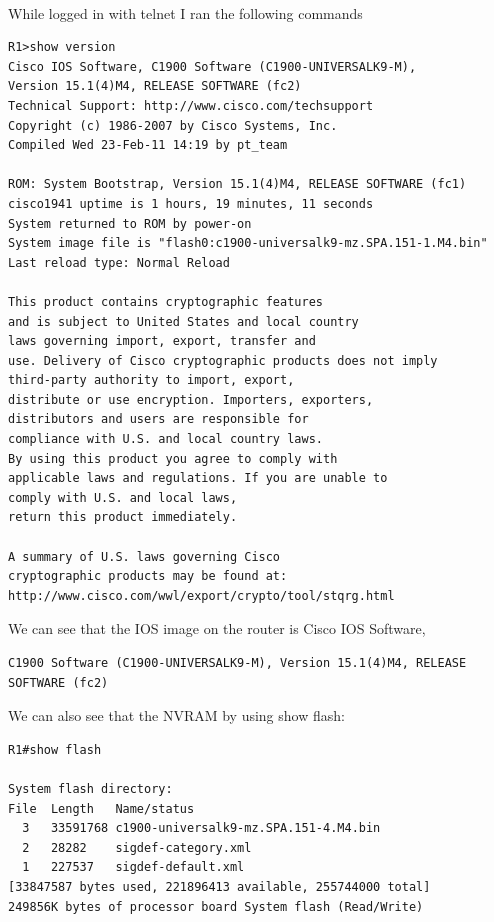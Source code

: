 \documentclass[../EngineeringJournal_CDavis.tex]{subfiles}
\begin{document}
\\
While logged in with telnet I ran the following commands
\begin{mdframed}
\scriptsize
\begin{verbatim}
R1>show version
Cisco IOS Software, C1900 Software (C1900-UNIVERSALK9-M), 
Version 15.1(4)M4, RELEASE SOFTWARE (fc2)
Technical Support: http://www.cisco.com/techsupport
Copyright (c) 1986-2007 by Cisco Systems, Inc.
Compiled Wed 23-Feb-11 14:19 by pt_team

ROM: System Bootstrap, Version 15.1(4)M4, RELEASE SOFTWARE (fc1)
cisco1941 uptime is 1 hours, 19 minutes, 11 seconds
System returned to ROM by power-on
System image file is "flash0:c1900-universalk9-mz.SPA.151-1.M4.bin"
Last reload type: Normal Reload

This product contains cryptographic features 
and is subject to United States and local country 
laws governing import, export, transfer and
use. Delivery of Cisco cryptographic products does not imply
third-party authority to import, export, 
distribute or use encryption. Importers, exporters, 
distributors and users are responsible for
compliance with U.S. and local country laws. 
By using this product you agree to comply with 
applicable laws and regulations. If you are unable to 
comply with U.S. and local laws, 
return this product immediately.

A summary of U.S. laws governing Cisco 
cryptographic products may be found at:
http://www.cisco.com/wwl/export/crypto/tool/stqrg.html

\end{verbatim}
\normalsize
\end{mdframed}

We can see that  the IOS image on the router is Cisco IOS Software,

\begin{mdframed}
\scriptsize
\begin{verbatim}
C1900 Software (C1900-UNIVERSALK9-M), Version 15.1(4)M4, RELEASE SOFTWARE (fc2)
\end{verbatim}
\normalsize
\end{mdframed}

We can also see that the NVRAM by using show flash:

\begin{mdframed}
\scriptsize
\begin{verbatim}
R1#show flash 

System flash directory:
File  Length   Name/status
  3   33591768 c1900-universalk9-mz.SPA.151-4.M4.bin
  2   28282    sigdef-category.xml
  1   227537   sigdef-default.xml
[33847587 bytes used, 221896413 available, 255744000 total]
249856K bytes of processor board System flash (Read/Write)
\end{verbatim}
\normalsize
\end{mdframed}
\end{document}

